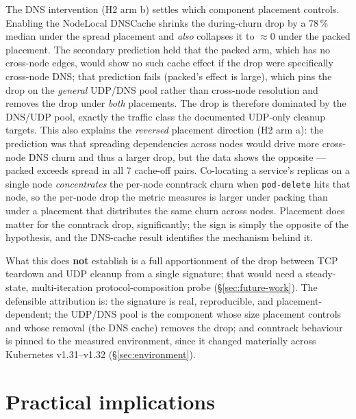 The DNS intervention (H2 arm b) settles which component placement controls.
Enabling the NodeLocal DNSCache shrinks the during-churn drop by a 78\,\% median
under the spread placement and \emph{also} collapses it to $\approx 0$ under the
packed placement. The secondary prediction held that the packed arm, which
has no cross-node edges, would show no such cache effect if the drop were
specifically cross-node DNS; that prediction fails (packed's effect is large),
which pins the drop on the \emph{general} UDP/DNS pool rather than cross-node
resolution and removes the drop under \emph{both} placements. The drop is
therefore dominated by the DNS/UDP pool, exactly the traffic class the documented
UDP-only cleanup targets.
This also explains the \emph{reversed} placement direction (H2 arm a): the
prediction was that spreading dependencies across nodes would drive
more cross-node DNS churn and thus a larger drop, but the data shows the
opposite --- packed exceeds spread in all 7 cache-off pairs. Co-locating a
service's replicas on a single node \emph{concentrates} the per-node conntrack
churn when \texttt{pod-delete} hits that node, so the per-node drop the metric
measures is larger under packing than under a placement that distributes the
same churn across nodes. Placement does matter for the conntrack drop,
significantly; the sign is simply the opposite of the hypothesis, and the
DNS-cache result identifies the mechanism behind it.

What this does \textbf{not} establish is a full apportionment of the drop
between TCP teardown and UDP cleanup from a single signature; that would need a
steady-state, multi-iteration protocol-composition probe (\S\ref{sec:future-work}).
The defensible attribution is: the signature is real, reproducible, and
placement-dependent; the UDP/DNS pool is the component whose size placement
controls and whose removal (the DNS cache) removes the drop; and conntrack
behaviour is pinned to the measured environment, since it changed materially
across Kubernetes v1.31--v1.32 (\S\ref{sec:environment}).

\section{Practical implications}\label{sec:implications}

